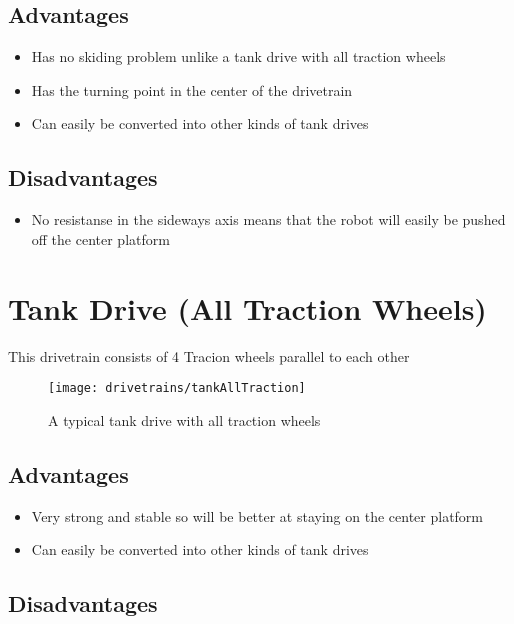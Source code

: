 \documentclass[../../main.tex]{subfiles}
\begin{document}
\subsection{Advantages}

\begin{itemize} \item Has no skiding problem unlike a tank drive with all traction wheels \item Has the turning point in the center of the drivetrain \item Can easily be converted into other kinds of tank drives \end{itemize}

\subsection{Disadvantages}

\begin{itemize} \item No resistanse in the sideways axis means that the robot will easily be pushed off the center platform \end{itemize}

\section{Tank Drive (All Traction Wheels)}

This drivetrain consists of 4 Tracion wheels parallel to each other

\begin{figure}[h] \centering

	\texttt{[image: drivetrains/tankAllTraction]} \caption{A typical tank drive with all traction wheels} \label{fig:drivetrainTankAllTraction} \end{figure}

\subsection{Advantages}

\begin{itemize} \item Very strong and stable so will be better at staying on the center platform \item Can easily be converted into other kinds of tank drives \end{itemize}

\subsection{Disadvantages}
\end{document}
